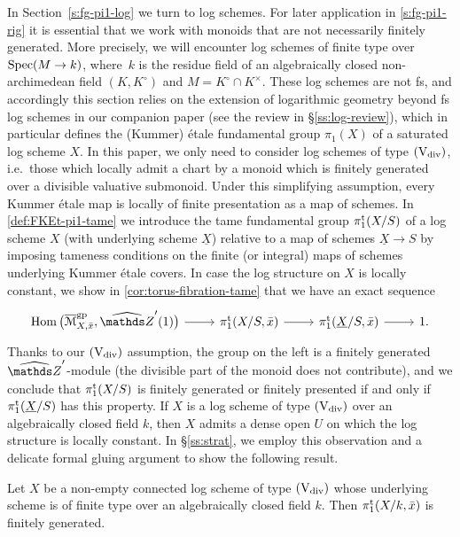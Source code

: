 In Section~\ref{s:fg-pi1-log} we turn to log schemes.
For later application in \cref{s:fg-pi1-rig} it is essential that we work with monoids that are not necessarily finitely generated.
More precisely, we will encounter log schemes of finite type over $\operatorname{Spec}(M \to k)$, where~$k$ is the residue field of an algebraically closed non-archimedean field $(K,K^\circ)$ and $M = K^\circ \cap K^\times$.
These log schemes are not fs, and accordingly this section relies on the extension of logarithmic geometry beyond fs log schemes in our companion paper \cite{AHLS-Log} (see the review in \S\ref{ss:log-review}), which in particular defines the (Kummer) \'etale fundamental group $\pi_1(X)$ of a saturated log scheme $X$. In this paper, we only need to consider log schemes of type $(\mathrm{V}_{\rm div})$, i.e.\ those which locally admit a chart by a monoid which is finitely generated over a divisible valuative submonoid. Under this simplifying assumption, every Kummer \'etale map is locally of finite presentation as a map of schemes. In \cref{def:FKEt-pi1-tame} we introduce the tame fundamental group $\pi_1^{\mathrm{t}}(X/S)$ of a log scheme $X$ 
(with underlying scheme $\underline{X}$)
relative to a map of schemes $\underline{X}\to S$ by imposing tameness conditions on the finite (or integral) maps of schemes underlying Kummer \'etale covers. In case the log structure on $X$ is locally constant, we show in \cref{cor:torus-fibration-tame} that we have an exact sequence 
\[
        \begin{tikzcd}
            \Hom\big(\ov \cM^\gp_{X,\bar x} ,\hZ'(1)\big) \ar[r] & \pitame(X/S,\bar x) \ar[r] & \pitame(\underline{X}/S,\bar x) \ar[r] & 1.
        \end{tikzcd}
    \]
Thanks to our $(\mathrm{V}_{\rm div})$ assumption, the group on the left is a finitely generated $\widehat{\bZ}'$-module (the divisible part of the monoid does not contribute), and we conclude that $\pi_1^{\mathrm{t}}(X/S)$ is finitely generated or finitely presented if and only if $\pi_1^{\mathrm{t}}(\underline{X}/S)$ has this property. If $X$ is a log scheme of type $(\mathrm{V}_{\rm div})$ over an algebraically closed field $k$, then $X$ admits a dense open $U$ on which the log structure is locally constant. In \S\ref{ss:strat}, we employ this observation and a delicate formal gluing argument to show the following result. 

\begin{thmABC} \label{thmABC:log pi1tame fg}
    Let $X$ be a non-empty connected log scheme of type $(\mathrm{V}_{\rm div})$ whose underlying scheme is of finite type over an algebraically closed field $k$.  Then $\pi_1^{\mathrm{t}}(X/k,\bar x)$ is finitely generated.
\end{thmABC}

